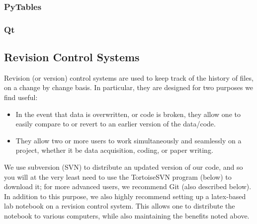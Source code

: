 \subsubsection{PyTables}
\subsubsection{Qt}
\subsection{Revision Control Systems}
Revision (or version) control systems
    are used to keep track of the history of files,
    on a change by change basis.
In particular, they are designed for two purposes we find useful:
\begin{itemize}
    \item In the event that data is overwritten, or code is broken,
        they allow one to easily compare to or revert to an earlier
        version of the data/code.
    \item They allow two or more users to work simultaneously and seamlessly
        on a project, whether it be data acquisition, coding, or paper writing.
\end{itemize}
We use subversion (SVN) to distribute an updated version of our code,
    and so you will at the very least need
    to use the TortoiseSVN program (below)
    to download it;
    for more advanced users, we recommend Git (also described below).
In addition to this purpose,
    we also highly recommend
    setting up a latex-based lab notebook
    on a revision control system.
This allows one to distribute the notebook
    to various computers, while also maintaining the benefits noted above.
